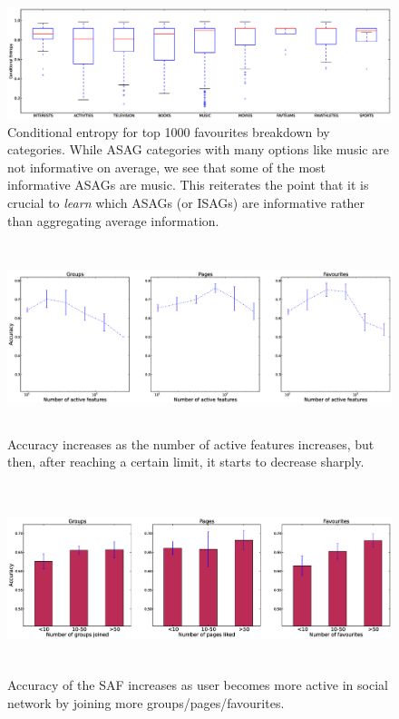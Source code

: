 \begin{figure}[tbp!]
\hspace{-12mm}\includegraphics[width=200mm]{data/plots/boxPlots/CEvsFavTypes.eps}
\vspace{-7mm}
\caption{Conditional entropy for top 1000 favourites breakdown by categories.  While ASAG categories
with many options like music are not informative on average, we see
that some of the most informative ASAGs are music.  This reiterates
the point that it is crucial to \emph{learn} which ASAGs (or ISAGs)
are informative rather than aggregating average information.}
\label{Fig5}
\end{figure}

\begin{figure}[tbh!]
\centering
\includegraphics[width=180mm, height=55mm]{data/plots/new/accuracyVsactiveFeatures.eps}
\vspace{-6mm}
\caption{Accuracy increases as the number of active features increases, but then, after reaching a certain limit, it starts to decrease sharply.
}
\label{fig:AccuracyVsactiveFeats}
\end{figure}

\begin{figure}[tbh!]
\centering
\includegraphics[width=180mm, height=55mm]{data/plots/new/accuracyVsmembership.eps}
\vspace{-6mm}
\caption{Accuracy of the SAF increases as user becomes more active in social network by joining more groups/pages/favourites.}
\label{AccuracyVsmembership}
\end{figure}

